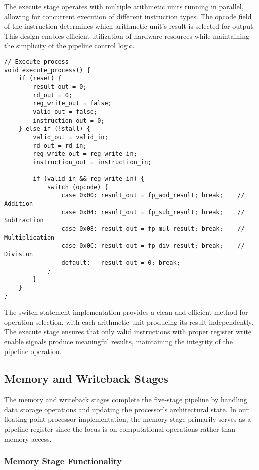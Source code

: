 The execute stage operates with multiple arithmetic units running in parallel, allowing for concurrent execution of different instruction types. The opcode field of the instruction determines which arithmetic unit's result is selected for output. This design enables efficient utilization of hardware resources while maintaining the simplicity of the pipeline control logic.

\begin{lstlisting}[caption={Execute Process}]
// Execute process
void execute_process() {
    if (reset) {
        result_out = 0;
        rd_out = 0;
        reg_write_out = false;
        valid_out = false;
        instruction_out = 0;
    } else if (!stall) {
        valid_out = valid_in;
        rd_out = rd_in;
        reg_write_out = reg_write_in;
        instruction_out = instruction_in;
        
        if (valid_in && reg_write_in) {
            switch (opcode) {
                case 0x00: result_out = fp_add_result; break;    // Addition
                case 0x04: result_out = fp_sub_result; break;    // Subtraction  
                case 0x08: result_out = fp_mul_result; break;    // Multiplication
                case 0x0C: result_out = fp_div_result; break;    // Division
                default:   result_out = 0; break;
            }
        }
    }
}
\end{lstlisting}

The switch statement implementation provides a clean and efficient method for operation selection, with each arithmetic unit producing its result independently. The execute stage ensures that only valid instructions with proper register write enable signals produce meaningful results, maintaining the integrity of the pipeline operation.

\subsection{Memory and Writeback Stages}
\label{subsec:memory_writeback}

The memory and writeback stages complete the five-stage pipeline by handling data storage operations and updating the processor's architectural state. In our floating-point processor implementation, the memory stage primarily serves as a pipeline register since the focus is on computational operations rather than memory access.

\subsubsection{Memory Stage Functionality}

